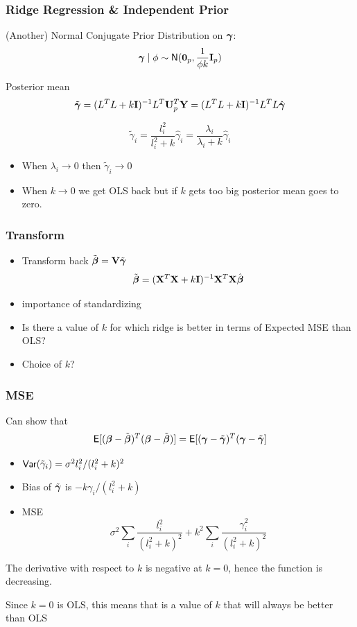 \documentclass[]{beamer}\usepackage[]{graphicx}\usepackage[]{color}
\begin{document}
\begin{frame}
  \frametitle{Ridge  Regression \& Independent Prior}
  (Another) Normal Conjugate Prior Distribution on $\boldsymbol{\gamma}$: $$\boldsymbol{\gamma} \mid \phi \sim \textsf{N}(\mathbf{0}_p, \frac{1}{ \phi
    k} \mathbf{I}_p)$$ \pause

Posterior mean
$$
 \tilde{\boldsymbol{\gamma}} =( L^TL + k \mathbf{I})^{-1} L^T \mathbf{U}^T_p\mathbf{Y}  = ( L^TL + k \mathbf{I})^{-1}
 L^TL\hat{\boldsymbol{\gamma}}
$$\pause

 $$\tilde{\gamma}_i = \frac{l_i^2}{l_i^2 + k} \hat{\gamma}_i =
 \frac{\lambda_i}{\lambda_i + k} \hat{\gamma}_i $$ \pause
 \begin{itemize}
\item When $\lambda_i \to 0$ then $\tilde{\gamma}_i \to 0$

\item When $k \to 0$ we get OLS back but if $k$ gets too  big posterior
  mean goes to zero.
 \end{itemize}

\end{frame}
\begin{frame}
  \frametitle{Transform}
  \begin{itemize}
  \item
  Transform back $\tilde{\boldsymbol{\beta}} = \mathbf{V} \tilde{\boldsymbol{\gamma}}$ \pause
  $$\tilde{\boldsymbol{\beta}} = (\mathbf{X}^T\mathbf{X} + k \mathbf{I})^{-1}  \mathbf{X}^T\mathbf{X} \hat{\boldsymbol{\beta}}$$ \pause
\item importance of standardizing \pause

\item Is there a value of $k$ for which ridge is better in terms of
  Expected MSE than OLS? \pause
\item Choice of $k$?
  \end{itemize}
\end{frame}
\begin{frame}\frametitle{MSE}
Can show that
 $$\textsf{E}[(\boldsymbol{\beta} - \tilde{\boldsymbol{\beta}})^T(\boldsymbol{\beta} - \tilde{\boldsymbol{\beta}})] = \textsf{E}[(\boldsymbol{\gamma} - \tilde{\boldsymbol{\gamma}})^T(\boldsymbol{\gamma} - \tilde{\boldsymbol{\gamma}}]$$
  \pause
 \begin{itemize}
 \item $\textsf{Var}(\tilde{\gamma}_i) = \sigma^2 l_i^2 /(l_i^2 +
   k)^2$ \pause
\item  Bias of $\tilde{\boldsymbol{\gamma}}$ is $-k \gamma_i/(l_i^2 + k)$ \pause
 \item  MSE $$\sigma^2 \sum_i \frac{l_i^2}{(l_i^2 + k)^2} +  k^2
   \sum_i \frac{\gamma_i^2} {(l_i^2 + k)^2} $$
 \end{itemize}
The derivative with respect to $k$ is negative at $k=0$, hence the
function is decreasing. \pause

\vspace{12pt}
Since $k = 0$ is OLS, this means that is a value of $k$ that will
always be better than OLS
\end{frame}
\end{document}
